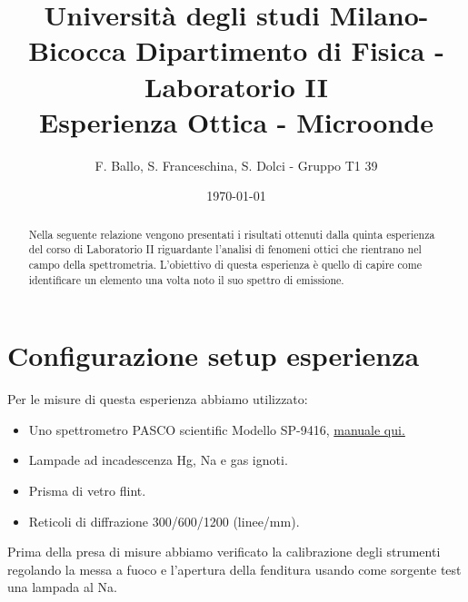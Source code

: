 \documentclass[letterpaper,12pt]{article}
\begin{document}
\title{{\small Università degli studi Milano-Bicocca  Dipartimento di Fisica - Laboratorio II }\\
	Esperienza Ottica - Microonde}
\author{F. Ballo, S. Franceschina, S. Dolci - Gruppo T1 39}
\date{\today}
\maketitle
\thispagestyle{logoheader}


\begin{abstract}
	Nella seguente relazione vengono presentati i risultati ottenuti dalla quinta esperienza del corso di 
    Laboratorio II riguardante l'analisi di fenomeni ottici che rientrano nel campo della spettrometria. L'obiettivo di questa esperienza è quello di capire come
    identificare un elemento una volta noto il suo spettro di emissione.
	\begin{adjustwidth}{-1cm}{-1cm}
	\end{adjustwidth}
\end{abstract}
\tableofcontents
\newpage

\section{Configurazione setup esperienza}
Per le misure di questa esperienza abbiamo utilizzato:

\begin{itemize}
    \item Uno spettrometro PASCO scientific Modello SP-9416, \href{https://cdn.pasco.com/product_document/Student-Spectrometer-Manual-SP-9268A.pdf}{manuale qui.}
    \item Lampade ad incadescenza Hg, Na e gas ignoti.
    \item Prisma di vetro flint.
    \item Reticoli di diffrazione 300/600/1200 (linee/mm).
\end{itemize}
Prima della presa di misure abbiamo verificato la calibrazione degli strumenti regolando la messa a fuoco e 
l'apertura della fenditura usando come sorgente test una lampada al Na.
    
\end{document}
